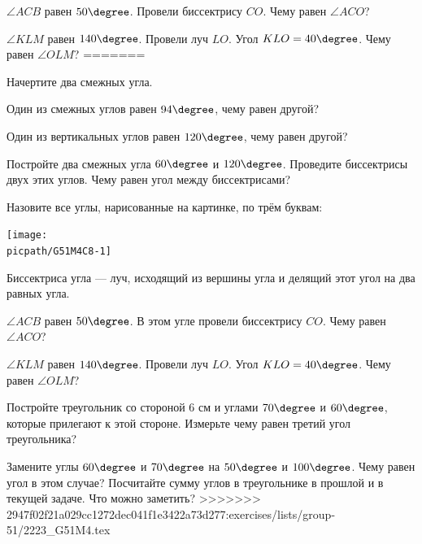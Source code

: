 \begin{class}[number=8]
\begin{listofex}
\begin{center}
 	\end{center}
 	\item \( \angle ACB \) равен \( 50\degree \). Провели биссектрису \( CO \). Чему равен \( \angle ACO \)?
 	\item \( \angle KLM \) равен \( 140\degree \). Провели луч \( LO \). Угол \( KLO=40\degree \). Чему равен \( \angle OLM \)?
=======
		\item Начертите два смежных угла.
		\item Один из смежных углов равен \( 94\degree \), чему равен другой?
		\item Один из вертикальных углов равен \( 120\degree \), чему равен другой?
		\item Постройте два смежных угла \( 60\degree \) и \( 120\degree \). Проведите биссектрисы двух этих углов. Чему равен угол между биссектрисами?
		\item
		\begin{minipage}[t]{\bodywidth}
			Назовите все углы, нарисованные на картинке, по трём буквам:
		\end{minipage}
		\hspace{0.03\linewidth}
		\begin{minipage}[c]{\picwidth}
			\texttt{[image: \\picpath/G51M4C8-1]}
		\end{minipage}
	\end{listofex}
	\begin{definit}
		Биссектриса угла --- луч, исходящий из вершины угла и делящий этот угол на два равных угла.
	\end{definit}
	\begin{listofex}[resume]
		\item \( \angle ACB \) равен \( 50\degree \). В этом угле провели биссектрису \( CO \). Чему равен \( \angle ACO \)?
		\item \( \angle KLM \) равен \( 140\degree \). Провели луч \( LO \). Угол \( KLO=40\degree \). Чему равен \( \angle OLM \)?
		\item Постройте треугольник со стороной \( 6 \) см и углами \( 70\degree \) и \( 60\degree \), которые прилегают к этой стороне. Измерьте чему равен третий угол треугольника?
		\item Замените углы \( 60\degree \) и \( 70\degree \) на \( 50\degree \) и \( 100\degree \). Чему равен угол в этом случае? Посчитайте сумму углов в треугольнике в прошлой и в текущей задаче. Что можно заметить?
>>>>>>> 2947f02f21a029cc1272dec041f1e3422a73d277:exercises/lists/group-51/2223_G51M4.tex
	\end{listofex}
\end{class}
